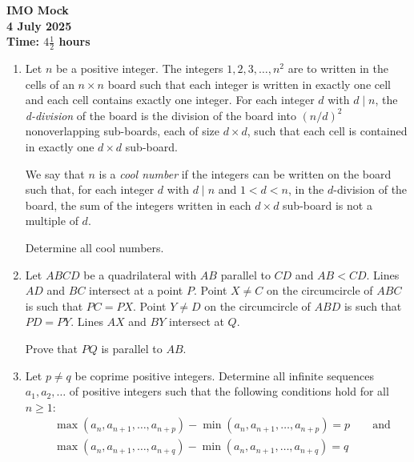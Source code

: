 \documentclass[11pt]{extarticle}
\begin{document}
\thispagestyle{empty}

\begin{center}
  \textbf{\Large IMO Mock}
  \\ \vspace{1em}
  \textbf{\large 4 July 2025}
  \\ \vspace{1em}
  \textbf{\large Time: $4\frac{1}{2}$ hours}
\end{center}


\begin{enumerate}[leftmargin=0pt,topsep=2\bigskipamount,itemsep=\medskipamount]

\item Let $n$ be a positive integer. The integers $1,2,3,\ldots,n^2$ are to written in the cells of an $n\times n$ board such that each integer is written in exactly one cell and each cell contains exactly one integer. For each integer $d$ with $d\mid n$, the \textit{d-division} of the board is the division of the board into ${(n/d)}^2$ nonoverlapping sub-boards, each of size $d\times d$, such that each cell is contained in exactly one $d\times d$ sub-board. 

We say that $n$ is a \textit{cool number} if the integers can be written on the board such that, for each integer $d$ with $d\mid n$ and $1<d<n$, in the $d$-division of the board, the sum of the integers written in each $d\times d$ sub-board is not a multiple of $d$.

Determine all cool numbers.

\item Let $ABCD$ be a quadrilateral with $AB$ parallel to $CD$ and $AB<CD$. Lines $AD$ and $BC$ intersect at a point $P$. Point $X\neq C$ on the circumcircle of $ABC$ is such that $PC=PX$. Point $Y\neq D$ on the circumcircle of $ABD$ is such that $PD=PY$. Lines $AX$ and $BY$ intersect at $Q$.

\vspace{0.35cm}
Prove that $PQ$ is parallel to $AB$.\\


\item Let $p\neq q$ be coprime positive integers. Determine all infinite sequences $a_1, a_2, \ldots$ of positive integers such that the following conditions hold for all $n\geqslant 1$:
\begin{align*}
    &\max(a_n, a_{n+1}, \ldots, a_{n+p})-\min(a_n, a_{n+1}, \ldots, a_{n+p})=p \quad\quad \text{and}\\
    &\max(a_n, a_{n+1}, \ldots, a_{n+q})-\min(a_n, a_{n+1}, \ldots, a_{n+q})=q \quad\quad
\end{align*}

\end{enumerate}
\end{document}
